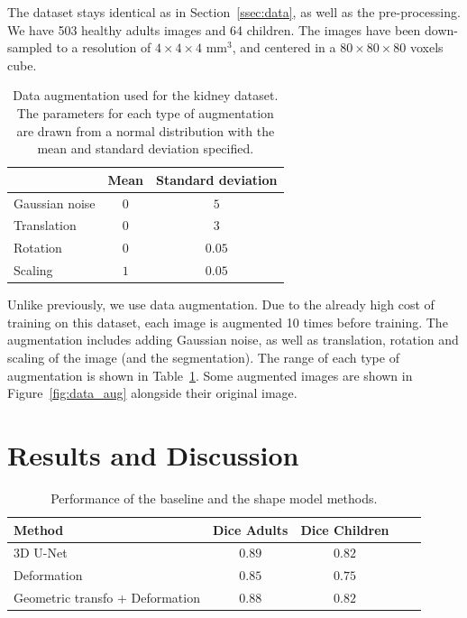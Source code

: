 The dataset stays identical as in Section~\ref{ssec:data}, as well as the pre-processing. We have 503 healthy adults images and 64 children. The images have been down-sampled to a resolution of $4 \times 4 \times 4$ mm$^3$, and centered in a $80 \times 80 \times 80$ voxels cube. 

\begin{table}[htb]
	\centering
	\begin{tabular}{|l|c|c|}
	    \hline
                        & Mean & Standard deviation \\
        \hline
         Gaussian noise & $0$ & $5$ \\
         Translation & $0$ & $3$ \\
         Rotation & $0$ & $0.05$ \\
         Scaling & $1$ & $0.05$ \\
        \hline
    \end{tabular}
	\caption{Data augmentation used for the kidney dataset. The parameters for each type of augmentation are drawn from a normal distribution with the mean and standard deviation specified.}
	\label{table:data_aug}
\end{table}

Unlike previously, we use data augmentation. Due to the already high cost of training on this dataset, each image is augmented 10 times before training. The augmentation includes adding Gaussian noise, as well as translation, rotation and scaling of the image (and the segmentation). The range of each type of augmentation is shown in Table~\ref{table:data_aug}. Some augmented images are shown in Figure~\ref{fig:data_aug} alongside their original image.

\section{Results and Discussion}
\label{sec:seg_result}

\begin{table}[htbp]
	\centering
\begin{tabular}{|l|c|c|c|c|}
	\hline
    Method & Dice Adults & Dice Children \\
	\hline
    3D U-Net & $\bm{0.89}$ & $\bm{0.82}$ \\
    Deformation & $0.85$ & $0.75$ \\
    Geometric transfo + Deformation & $0.88$ & $\bm{0.82}$ \\
    \hline
\end{tabular}
	\vspace{2mm}
	\caption{Performance of the baseline and the shape model methods.}
    \label{table:seg_results}
\end{table}

